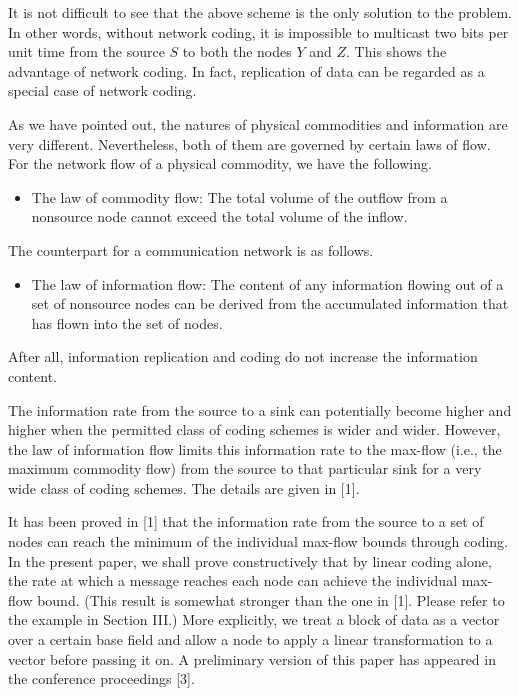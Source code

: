 \documentclass{IEEEtran}
\begin{document}
\par
It is not difficult to see that the above scheme is the only solution to the problem. In other words, without network coding, it is impossible to multicast two bits per unit time from the source $S$ to both the nodes $Y$ and $Z$. This shows the advantage of network coding. In fact, replication of data can be regarded as a special case of network coding.
\par
As we have pointed out, the natures of physical commodities and information are very different. Nevertheless, both of them are governed by certain laws of flow. For the network flow of a physical commodity, we have the following.
\begin{itemize}
	\item The law of commodity flow: The total volume of the outflow from a nonsource node cannot exceed the total volume of the inflow.
\end{itemize}
The counterpart for a communication network is as follows.
\begin{itemize}
	\item The law of information flow: The content of any information flowing out of a set of nonsource nodes can be derived from the accumulated information that has flown into the set of nodes.
\end{itemize}
After all, information replication and coding do not increase the information content.
\par
The information rate from the source to a sink can potentially become higher and higher when the permitted class of coding schemes is wider and wider. However, the law of information flow limits this information rate to the max-flow (i.e., the maximum commodity flow) from the source to that particular sink for a very wide class of coding schemes. The details are given in [1].
\par
It has been proved in [1] that the information rate from the source to a set of nodes can reach the minimum of the individual max-flow bounds through coding. In the present paper, we shall prove constructively that by linear coding alone, the rate at which a message reaches each node can achieve the individual max-flow bound. (This result is somewhat stronger than the one in [1]. Please refer to the example in Section III.) More explicitly, we treat a block of data as a vector over a certain base field and allow a node to apply a linear transformation to a vector before passing it on. A preliminary version of this paper has appeared in the conference proceedings [3].
\par
\end{document}
